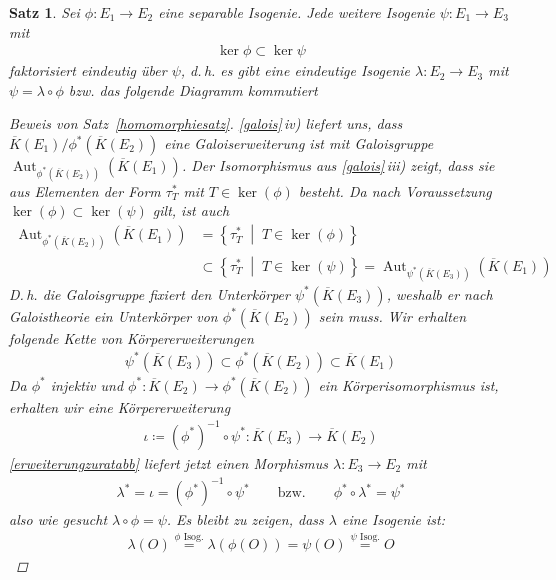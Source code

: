 \documentclass[english, german, parskip=half]{scrartcl}
\newtheorem{Satz}{Satz}[section]
\theoremstyle{definition}
\theoremstyle{remark}
\newcommand*{\algK}{\ensuremath{\overline K}} %
\newcommand*{\longto}{\longrightarrow}
\DeclareMathOperator{\Aut}{Aut} %
\begin{document}
\begin{Satz}\label{homomorphiesatz}
  Sei $\phi\colon E_1\to E_2$ eine separable Isogenie.
  Jede weitere Isogenie $\psi\colon E_1\to E_3$ mit
  \begin{gather*}
    \ker\phi \subset \ker\psi
  \end{gather*}
  faktorisiert eindeutig über $\psi$, d.\,h. es gibt eine eindeutige
  Isogenie $\lambda\colon E_2\to E_3$ mit
  $\psi = \lambda\circ\phi$
  bzw. das folgende Diagramm kommutiert
  \begin{center}
  \end{center}
  \begin{proof}[Beweis von Satz~\autoref{homomorphiesatz}]
    \autoref{galois}\,iv) liefert uns, dass
    $\algK(E_1)/\phi^*(\algK(E_2))$ eine Galoiserweiterung ist mit
  Galoisgruppe $\Aut_{\phi^*(\algK(E_2))}(\algK(E_1))$.
  Der Isomorphismus aus \autoref{galois}\,iii) zeigt, dass sie aus
  Elementen der Form $\tau_T^*$ mit $T\in\ker(\phi)$ besteht.
  Da nach Voraussetzung $\ker(\phi)\subset\ker(\psi)$ gilt,
  ist auch
  \begin{align*}
    \Aut_{\phi^*(\algK(E_2))}(\algK(E_1))
    &= \left\{ \tau_T^* \;\middle|\; T\in\ker(\phi) \right\} \\
    &\subset
      \left\{ \tau_T^* \;\middle|\; T\in\ker(\psi) \right\}
      = \Aut_{\psi^*(\algK(E_3))}(\algK(E_1))
  \end{align*}
  D.\,h. die Galoisgruppe fixiert den Unterkörper
  $\psi^*(\algK(E_3))$, weshalb er nach Galoistheorie ein
  Unterkörper von $\phi^*(\algK(E_2))$ sein muss.
  Wir erhalten folgende Kette von Körpererweiterungen
  \begin{gather*}
    \psi^*(\algK(E_3)) 
    \subset \phi^*(\algK(E_2)) 
    \subset \algK(E_1)
  \end{gather*}
  Da $\phi^*$ injektiv und 
  $\phi^*\colon\algK(E_2)\to\phi^*(\algK(E_2))$ ein
  Körperisomorphismus ist, erhalten wir eine Körpererweiterung
  \begin{gather*}
    \iota\coloneqq 
    (\phi^*)^{-1} \circ \psi^*
    \colon \algK(E_3) \longto \algK(E_2)
  \end{gather*}
  \autoref{erweiterungzuratabb} liefert jetzt einen Morphismus
  $\lambda\colon E_3\to E_2$ mit
  \begin{gather*}
    \lambda^* = \iota = (\phi^*)^{-1} \circ \psi^*
    \qquad\text{bzw.}\qquad
    \phi^*\circ\lambda^* = \psi^*
  \end{gather*}
  also wie gesucht $\lambda\circ\phi = \psi$.
  Es bleibt zu zeigen, dass $\lambda$ eine Isogenie ist:
  \begin{gather*}
    \lambda(O) 
    \overset{\text{$\phi$ Isog.}}{=} \lambda(\phi(O))
    = \psi(O) 
    \overset{\text{$\psi$ Isog.}}{=} O
  \end{gather*}
\end{proof}
\end{Satz}
\end{document}
